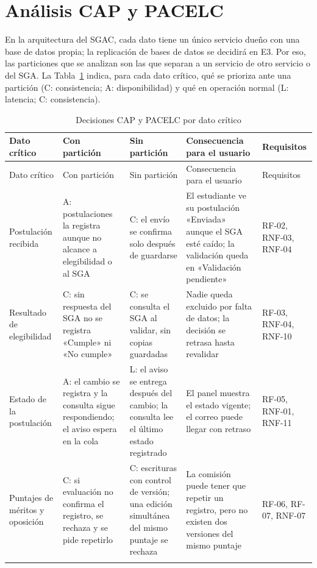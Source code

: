 \section{Análisis CAP y PACELC}
\label{sec:analisis-cap}

En la arquitectura del SGAC, cada dato tiene un único servicio dueño con una base de datos propia; la replicación de bases de datos se decidirá en E3. Por eso, las particiones que se analizan son las que separan a un servicio de otro servicio o del SGA. La Tabla~\ref{tab:cap} indica, para cada dato crítico, qué se prioriza ante una partición (C: consistencia; A: disponibilidad) y qué en operación normal (L: latencia; C: consistencia).

\begingroup
\small
\begin{longtable}{@{}>{\raggedright\arraybackslash}p{.16\linewidth}>{\raggedright\arraybackslash}p{.19\linewidth}>{\raggedright\arraybackslash}p{.16\linewidth}>{\raggedright\arraybackslash}p{.26\linewidth}>{\raggedright\arraybackslash}p{.11\linewidth}@{}}
\caption{Decisiones CAP y PACELC por dato crítico}\label{tab:cap}\\
\toprule
Dato crítico & Con partición & Sin partición & Consecuencia para el usuario & Requisitos \\
\midrule
\endfirsthead
\toprule
Dato crítico & Con partición & Sin partición & Consecuencia para el usuario & Requisitos \\
\midrule
\endhead
\bottomrule
\endfoot
Postulación recibida & A: postulaciones la registra aunque no alcance a elegibilidad o al SGA & C: el envío se confirma solo después de guardarse & El estudiante ve su postulación «Enviada» aunque el SGA esté caído; la validación queda en «Validación pendiente» & RF-02, RNF-03, RNF-04 \\ \addlinespace
Resultado de elegibilidad & C: sin respuesta del SGA no se registra «Cumple» ni «No cumple» & C: se consulta el SGA al validar, sin copias guardadas & Nadie queda excluido por falta de datos; la decisión se retrasa hasta revalidar & RF-03, RNF-04, RNF-10 \\ \addlinespace
Estado de la postulación & A: el cambio se registra y la consulta sigue respondiendo; el aviso espera en la cola & L: el aviso se entrega después del cambio; la consulta lee el último estado registrado & El panel muestra el estado vigente; el correo puede llegar con retraso & RF-05, RNF-01, RNF-11 \\ \addlinespace
Puntajes de méritos y oposición & C: si evaluación no confirma el registro, se rechaza y se pide repetirlo & C: escrituras con control de versión; una edición simultánea del mismo puntaje se rechaza & La comisión puede tener que repetir un registro, pero no existen dos versiones del mismo puntaje & RF-06, RF-07, RNF-07 \\ \addlinespace

\end{longtable}
